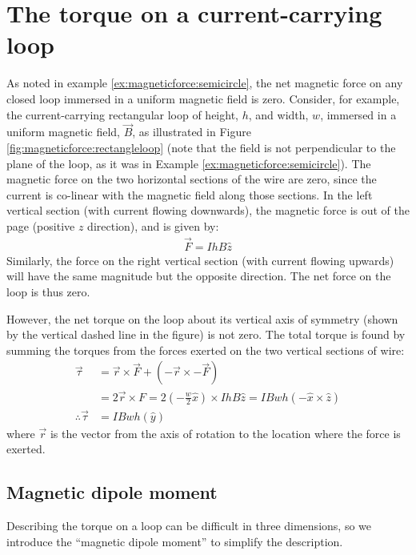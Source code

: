 \section{The torque on a current-carrying loop}
As noted in example \ref{ex:magneticforce:semicircle}, the net magnetic force on any closed loop immersed in a uniform magnetic field is zero. Consider, for example, the current-carrying rectangular loop of height, $h$, and width, $w$, immersed in a uniform magnetic field, $\vec B$, as illustrated in Figure \ref{fig:magneticforce:rectangleloop} (note that the field is not perpendicular to the plane of the loop, as it was in Example \ref{ex:magneticforce:semicircle}).
The magnetic force on the two horizontal sections of the wire are zero, since the current is co-linear with the magnetic field along those sections. In the left vertical section (with current flowing downwards), the magnetic force is out of the page (positive $z$ direction), and is given by:
\begin{align*}
\vec F = IhB\hat z
\end{align*}
Similarly, the force on the right vertical section (with current flowing upwards) will have the same magnitude but the opposite direction. The net force on the loop is thus zero. 

However, the net torque on the loop about its vertical axis of symmetry (shown by the vertical dashed line in the figure) is not zero. The total torque is found by summing the torques from the forces exerted on the two vertical sections of wire:
\begin{align*}
\vec \tau &= \vec r\times \vec F + (-\vec r \times - \vec F)\\
&= 2 \vec r \times F = 2 (-\frac{w}{2}\hat x) \times IhB\hat z = IBwh (-\hat x\times \hat z)\\
\therefore \vec \tau&=IBwh (\hat y)
\end{align*}
where $\vec r$ is the vector from the axis of rotation to the location where the force is exerted.

\subsection{Magnetic dipole moment}
\label{sec:MagneticForce:dipolemoment}
Describing the torque on a loop can be difficult in three dimensions, so we introduce the ``magnetic dipole moment'' to simplify the description.

